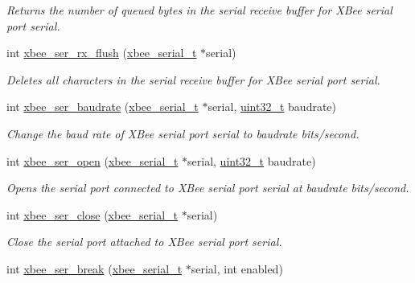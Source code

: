 \begin{DoxyCompactItemize}
\begin{DoxyCompactList}\small\item\em Returns the number of queued bytes in the serial receive buffer for X\+Bee serial port {\itshape serial}. \end{DoxyCompactList}\item 
int \hyperlink{group__hal__dos_ga98a6d5ceb5e1445e8ef82ccaa65a8c15}{xbee\+\_\+ser\+\_\+rx\+\_\+flush} (\hyperlink{structxbee__serial__t}{xbee\+\_\+serial\+\_\+t} $\ast$serial)
\begin{DoxyCompactList}\small\item\em Deletes all characters in the serial receive buffer for X\+Bee serial port {\itshape serial}. \end{DoxyCompactList}\item 
int \hyperlink{group__hal__dos_gab3c12543a07e0669b672c5cab54b0926}{xbee\+\_\+ser\+\_\+baudrate} (\hyperlink{structxbee__serial__t}{xbee\+\_\+serial\+\_\+t} $\ast$serial, \hyperlink{group__hal__dos_ga09a1e304d66d35dd47daffee9731edaa}{uint32\+\_\+t} baudrate)
\begin{DoxyCompactList}\small\item\em Change the baud rate of X\+Bee serial port {\itshape serial} to {\itshape baudrate} bits/second. \end{DoxyCompactList}\item 
int \hyperlink{group__hal__dos_gaa615a221dd69c17ee2989c281f2bf04a}{xbee\+\_\+ser\+\_\+open} (\hyperlink{structxbee__serial__t}{xbee\+\_\+serial\+\_\+t} $\ast$serial, \hyperlink{group__hal__dos_ga09a1e304d66d35dd47daffee9731edaa}{uint32\+\_\+t} baudrate)
\begin{DoxyCompactList}\small\item\em Opens the serial port connected to X\+Bee serial port {\itshape serial} at {\itshape baudrate} bits/second. \end{DoxyCompactList}\item 
int \hyperlink{group__hal__dos_ga48b9d743a446074ea6abacd0de24044d}{xbee\+\_\+ser\+\_\+close} (\hyperlink{structxbee__serial__t}{xbee\+\_\+serial\+\_\+t} $\ast$serial)
\begin{DoxyCompactList}\small\item\em Close the serial port attached to X\+Bee serial port {\itshape serial}. \end{DoxyCompactList}\item 
int \hyperlink{group__hal__dos_ga6ae89792415a7ac8b45b56188eb9eeb4}{xbee\+\_\+ser\+\_\+break} (\hyperlink{structxbee__serial__t}{xbee\+\_\+serial\+\_\+t} $\ast$serial, int enabled)

\end{DoxyCompactItemize}
